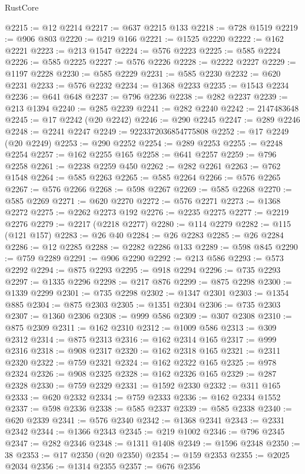 \begin{lexlean}{RustCore}
\begin{coremodule}
@2215 := @12 @2214
@2217 := @637 @2215 @133
@2218 := @728 @1519
@2219 := @906 @803
@2220 := @219 @166
@2221 := @1525 @2220
@2222 := @162 @2221
@2223 := @213 @1547
@2224 := @576 @2223
@2225 := @585 @2224
@2226 := @585 @2225
@2227 := @576 @2226
@2228 := @2222 @2227
@2229 := @1197 @2228
@2230 := @585 @2229
@2231 := @585 @2230
@2232 := @620 @2231
@2233 := @576 @2232
@2234 := @1368 @2233
@2235 := @1543 @2234
@2236 := @641 @648
@2237 := @796 @2236
@2238 := @282 @2237
@2239 := @213 @1394
@2240 := @285 @2239
@2241 := @282 @2240
@2242 := 2147483648
@2245 := @17 @2242 (@20 @2242)
@2246 := @290 @2245
@2247 := @289 @2246
@2248 := @2241 @2247
@2249 := 9223372036854775808
@2252 := @17 @2249 (@20 @2249)
@2253 := @290 @2252
@2254 := @289 @2253
@2255 := @2248 @2254
@2257 := @162 @2255 @165
@2258 := @641 @2257
@2259 := @796 @2258
@2261 := @2238 @2259 @450
@2262 := @282 @2261
@2263 := @762 @1548
@2264 := @585 @2263
@2265 := @585 @2264
@2266 := @576 @2265
@2267 := @576 @2266
@2268 := @598 @2267
@2269 := @585 @2268
@2270 := @585 @2269
@2271 := @620 @2270
@2272 := @576 @2271
@2273 := @1368 @2272
@2275 := @2262 @2273 @192
@2276 := @2235 @2275
@2277 := @2219 @2276
@2279 := @2217 (@2218 @2277)
@2280 := @114 @2279
@2282 := @115 (@121 @157)
@2283 := @26 @40
@2284 := @26 @2283
@2285 := @26 @2284
@2286 := @12 @2285
@2288 := @2282 @2286 @133
@2289 := @598 @845
@2290 := @759 @2289
@2291 := @906 @2290
@2292 := @213 @586
@2293 := @573 @2292
@2294 := @875 @2293
@2295 := @918 @2294
@2296 := @735 @2293
@2297 := @1335 @2296
@2298 := @217 @876
@2299 := @875 @2298
@2300 := @1339 @2299
@2301 := @735 @2298
@2302 := @1347 @2301
@2303 := @1354 @885
@2304 := @875 @2303
@2305 := @1351 @2304
@2306 := @735 @2303
@2307 := @1360 @2306
@2308 := @999 @586
@2309 := @307 @2308
@2310 := @875 @2309
@2311 := @162 @2310
@2312 := @1009 @586
@2313 := @309 @2312
@2314 := @875 @2313
@2316 := @162 @2314 @165
@2317 := @999 @2316
@2318 := @908 @2317
@2320 := @162 @2318 @165
@2321 := @2311 @2320
@2322 := @759 @2321
@2324 := @162 @2322 @165
@2325 := @978 @2324
@2326 := @908 @2325
@2328 := @162 @2326 @165
@2329 := @287 @2328
@2330 := @759 @2329
@2331 := @1592 @2330
@2332 := @311 @165
@2333 := @620 @2332
@2334 := @759 @2333
@2336 := @162 @2334 @1552
@2337 := @598 @2336
@2338 := @585 @2337
@2339 := @585 @2338
@2340 := @620 @2339
@2341 := @576 @2340
@2342 := @1368 @2341
@2343 := @2331 @2342
@2344 := @1366 @2343
@2345 := @219 @1002
@2346 := @796 @2345
@2347 := @282 @2346
@2348 := @1311 @1408
@2349 := @1596 @2348
@2350 := 38
@2353 := @17 @2350 (@20 @2350)
@2354 := @159 @2353
@2355 := @2025 @2034
@2356 := @1314 @2355
@2357 := @676 @2356

\end{coremodule}
\end{lexlean}
